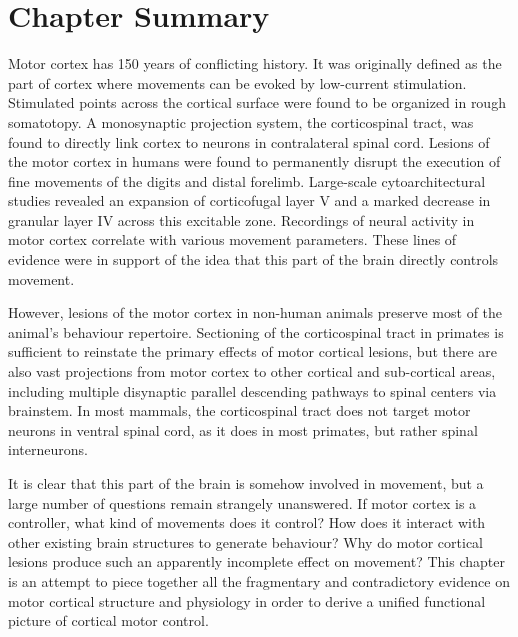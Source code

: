 				
\section{Chapter Summary}

Motor cortex has 150 years of conflicting history. It was originally defined as the part of cortex where movements can be evoked by low-current stimulation. Stimulated points across the cortical surface were found to be organized in rough somatotopy. A monosynaptic projection system, the corticospinal tract, was found to directly link cortex to neurons in contralateral spinal cord. Lesions of the motor cortex in humans were found to permanently disrupt the execution of fine movements of the digits and distal forelimb. Large-scale cytoarchitectural studies revealed an expansion of corticofugal layer V and a marked decrease in granular layer IV across this excitable zone. Recordings of neural activity in motor cortex correlate with various movement parameters. These lines of evidence were in support of the idea that this part of the brain directly controls movement.

However, lesions of the motor cortex in non-human animals preserve most of the animal's behaviour repertoire. Sectioning of the corticospinal tract in primates is sufficient to reinstate the primary effects of motor cortical lesions, but there are also vast projections from motor cortex to other cortical and sub-cortical areas, including multiple disynaptic parallel descending pathways to spinal centers via brainstem. In most mammals, the corticospinal tract does not target motor neurons in ventral spinal cord, as it does in most primates, but rather spinal interneurons.

It is clear that this part of the brain is somehow involved in movement, but a large number of questions remain strangely unanswered. If motor cortex is a controller, what kind of movements does it control? How does it interact with other existing brain structures to generate behaviour? Why do motor cortical lesions produce such an apparently incomplete effect on movement? This chapter is an attempt to piece together all the fragmentary and contradictory evidence on motor cortical structure and physiology in order to derive a unified functional picture of cortical motor control.

\pagebreak


